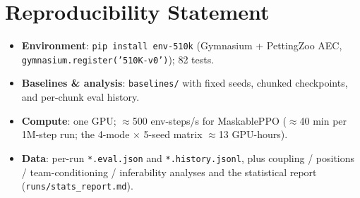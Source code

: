 \documentclass{article}
\begin{document}
\section*{Reproducibility Statement}
\begin{itemize}
\item \textbf{Environment}: \texttt{pip install env-510k} (Gymnasium +
PettingZoo AEC, \texttt{gymnasium.register('510K-v0')}); 82 tests.
\item \textbf{Baselines \& analysis}: \texttt{baselines/} with fixed seeds,
chunked checkpoints, and per-chunk eval history.
\item \textbf{Compute}: one GPU; $\approx$500 env-steps/s for MaskablePPO
($\approx$40 min per 1M-step run; the 4-mode $\times$ 5-seed matrix
$\approx$13 GPU-hours).
\item \textbf{Data}: per-run \texttt{*.eval.json} and \texttt{*.history.jsonl},
plus coupling / positions / team-conditioning / inferability analyses and the
statistical report (\texttt{runs/stats\_report.md}).
\end{itemize}
\end{document}
